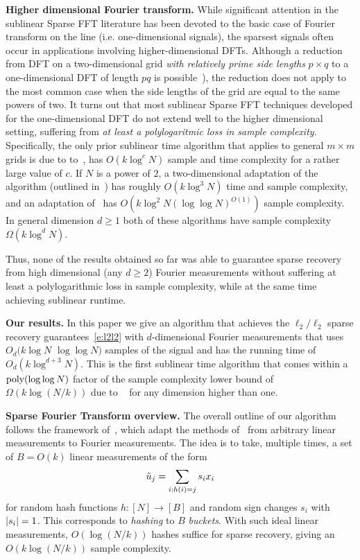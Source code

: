 {\bf Higher dimensional Fourier transform.}  While significant attention in the sublinear Sparse FFT literature has been devoted to the basic case of Fourier transform on the line (i.e. one-dimensional signals),  the  sparsest signals often occur in applications involving higher-dimensional DFTs.  Although a reduction from DFT on a two-dimensional grid {\em with relatively prime side lengths} $p \times q$ to a one-dimensional DFT of length $pq$ is possible~\cite{GMS,Iw-arxiv}),  the reduction does not apply to the most common case when the side lengths of the grid are equal to the same powers of two. It turns out that most sublinear Sparse FFT techniques developed for the one-dimensional DFT do not extend well to the higher dimensional setting, suffering from {\em at least a polylogaritmic loss in sample complexity}. Specifically, the only prior sublinear time algorithm that applies to general $m\times m$ grids is due to  to~\cite{GMS}, has $O(k \log^c N)$ sample and time complexity for a
 rather large value of $c$.  If $N$ is a power of $2$, a
 two-dimensional adaptation of the~\cite{HIKP2} algorithm (outlined in~\cite{GHIKPS}) 
has roughly $O(k \log^3 N)$ time and sample complexity, and an adaptation of~\cite{IKP} has $O(k\log^2 N(\log\log N)^{O(1)})$ sample complexity. In general dimension $d\geq 1$ both of these algorithms have sample complexity $\Omega(k\log^d N)$.

Thus, none of the results obtained so far was able to guarantee sparse recovery from high dimensional (any $d\geq 2$) Fourier measurements without suffering at least a polylogarithmic loss in sample complexity, while at the same time achieving sublinear runtime. 



{\bf Our results.} In this paper we give an algorithm that achieves the $\ell_2/\ell_2$ sparse recovery guarantees~\eqref{e:l2l2} with $d$-dimensional Fourier measurements that uses $O_d(k \log N$ $\log \log N)$ samples of the signal and has the running time of $O_d(k \log^{d+3} N)$. This is the first sublinear time algorithm that comes within a $\text{poly}(\log\log N)$ factor of the sample complexity lower bound of $\Omega(k\log (N/k))$ due to ~\cite{DIPW} for any dimension higher than one.


{\bf Sparse Fourier Transform overview.}  The overall outline of our algorithm follows the framework of~\cite{GMS, HIKP2,IKP,IK14a}, which adapt the methods of~\cite{CCF,GLPS} from arbitrary linear
measurements to Fourier measurements.  The idea is to take, multiple times,  a set of $B=O(k)$
linear measurements of the form
\[
\tilde{u}_j = \sum_{i : h(i) = j} s_i x_i 
\]
for random hash functions $h: [N] \to [B]$ and random sign changes
$s_i$ with $|s_i| = 1$.  This corresponds to \emph{hashing} to $B$
\emph{buckets}.  With such ideal linear measurements, $O(\log(N/k))$
hashes suffice for sparse recovery, giving an $O(k \log(N/k))$ sample
complexity.

